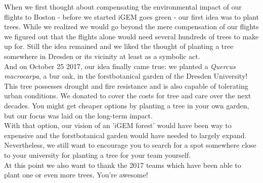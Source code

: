 When we first thought about compensating the environmental impact of our flights to Boston - before we started iGEM goes green - our first idea was to plant trees. While we realized we would go beyond the mere compensation of our flights we figured out that the flights alone would need several hundreds of trees to make up for. Still the idea remained and we liked the thought of planting a tree somewhere in Dresden or its vicinity at least as a symbolic act. \\
And on October 25 2017, our idea finally came true: we planted a \textit{Quercus macrocarpa}, a bur oak, in the forstbotanical garden of the Dresden University! This tree possesses drought and fire resistance and is also capable of tolerating urban conditions. We donated  to cover the costs for tree and care over the next decades. You might get cheaper options by planting a tree in your own garden, but our focus was laid on the long-term impact. \\
With that option, our vision of an 'iGEM forest' would have been way to expensive and the forstbotanical garden would have needed to largely expand. Nevertheless, we still want to encourage you to search for a spot somewhere close to your university for planting a tree for your team yourself. \\
At this point we also want to thank the 2017 teams which have been able to plant one or even more trees. You're awesome!


